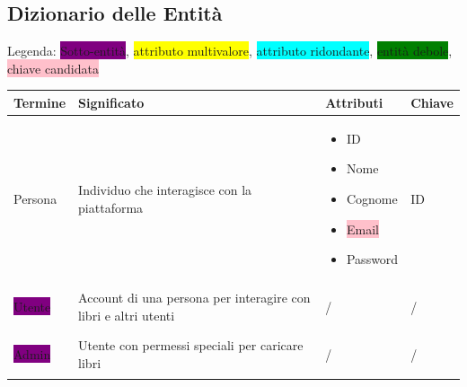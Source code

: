 \documentclass{article}
\begin{document}
\newpage
\subsection{Dizionario delle Entità}

Legenda: \colorbox{purple}{Sotto-entità}, \colorbox{yellow}{attributo multivalore},
\colorbox{cyan}{attributo ridondante}, \colorbox{green}{entità debole}, \colorbox{pink}{chiave candidata}
\\
\begin{center}
	\renewcommand{\arraystretch}{1.5} %
	\begin{longtable}{|p{2cm}|p{4cm}|p{3cm}|p{2.5cm}|}
		\hline
		\textbf{Termine}                & \textbf{Significato}                                           & \textbf{Attributi} & \textbf{Chiave} \\
		\hline
		\endfirsthead

		Persona                         & Individuo che interagisce con la piattaforma                   &
		\footnotesize
		\begin{itemize}
			\item ID
			\item Nome
			\item Cognome
			\item \colorbox{pink}{Email}
			\item Password
		\end{itemize}    & ID                                                                                                             \\
		\hline

		\colorbox{purple}{Utente}       & Account di una persona per interagire con libri e altri utenti &
		\begin{center}
			/
		\end{center}                  & \begin{center}
			                                /
		                                \end{center}                                                                                           \\
		\hline

		\colorbox{purple}{Admin}        & Utente con permessi speciali per caricare libri                &
		\begin{center}
			/
		\end{center}                  & \begin{center}
			                                /
		                                \end{center}                                                                                           \\
		\hline


\end{longtable}
\end{center}
\end{document}
